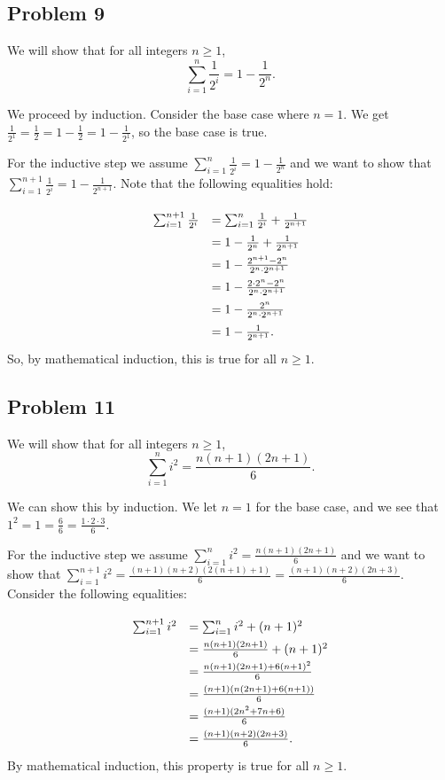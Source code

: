 \documentclass[11pt]{article}
\begin{document}
\subsection*{Problem 9}
We will show that for all integers $n \geq 1$,
\[ \sum^n_{i=1}\frac{1}{2^i} = 1-\frac{1}{2^n}. \]

We proceed by induction. Consider the base case where $n=1$. We get
$\frac{1}{2^1} = \frac{1}{2} = 1 - \frac{1}{2} = 1 - \frac{1}{2^1}$, so the
base case is true.

For the inductive step we assume $\sum^n_{i=1}\frac{1}{2^i} = 1-\frac{1}{2^n}$
and we want to show that $\sum^{n+1}_{i=1}\frac{1}{2^i} = 1-\frac{1}{2^{n+1}}$.
Note that the following equalities hold:

\[
\def\arraystretch{1.5}
\begin{array}{rl}
\sum^{n+1}_{i=1}\frac{1}{2^i} &= \sum^{n}_{i=1}\frac{1}{2^i} + \frac{1}{2^{n+1}} \\
&= 1 - \frac{1}{2^n} + \frac{1}{2^{n+1}} \\
&= 1 - \frac{2^{n+1} - 2^n}{2^n\cdot 2^{n+1}} \\
&= 1 - \frac{2\cdot 2^n - 2^n}{2^n\cdot 2^{n+1}} \\
&= 1 - \frac{2^n}{2^n\cdot 2^{n+1}} \\
&= 1 - \frac{1}{2^{n+1}}.
\end{array}
\]
So, by mathematical induction, this is true for all $n \geq 1$.

\subsection*{Problem 11}

We will show that for all integers $n \geq 1$,
\[ \sum^n_{i=1}i^2= \frac{n(n+1)(2n+1)}{6}. \]

We can show this by induction. We let $n=1$ for the base case, and we see that
$1^2 = 1 = \frac{6}{6} = \frac{1\cdot 2\cdot 3}{6}$.

For the inductive step we assume $\sum^n_{i=1}i^2= \frac{n(n+1)(2n+1)}{6}$
and we want to show that 
$\sum^{n+1}_{i=1}i^2= \frac{(n+1)(n+2)(2(n+1)+1)}{6}=\frac{(n+1)(n+2)(2n+3)}{6} $.
Consider the following equalities:

\[
\def\arraystretch{1.5}
\begin{array}{rl}
\sum^{n+1}_{i=1}i^2 &= \sum^{n}_{i=1}i^2 + (n+1)^2 \\
&= \frac{n(n+1)(2n+1)}{6} + (n+1)^2 \\
&= \frac{n(n+1)(2n+1) + 6(n+1)^2}{6} \\
&= \frac{(n+1)(n(2n+1) + 6(n+1))}{6} \\
&= \frac{(n+1)(2n^2+7n+6)}{6} \\
&= \frac{(n+1)(n+2)(2n+3)}{6}.
\end{array}
\]
By mathematical induction, this property is true for all $n \geq 1$.
\end{document}
